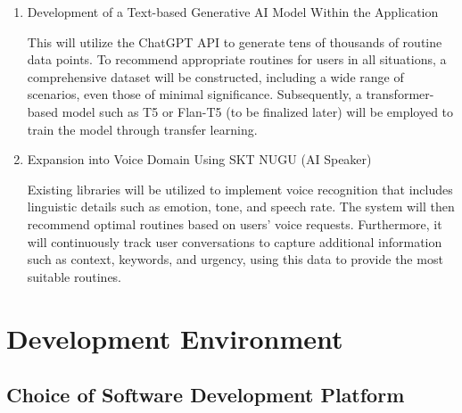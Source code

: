 \documentclass[conference]{IEEEtran}
\begin{document}
\begin{enumerate}[label=\arabic*]
    \item Development of a Text-based Generative AI Model Within the Application\par
    \vspace{0.3em}
    This will utilize the ChatGPT API to generate tens of thousands of routine data points. To recommend appropriate routines for users in all situations, a comprehensive dataset will be constructed, including a wide range of scenarios, even those of minimal significance. Subsequently, a transformer-based model such as T5 or Flan-T5 (to be finalized later) will be employed to train the model through transfer learning.

    \vspace{1em}

    \item Expansion into Voice Domain Using SKT NUGU (AI Speaker)\par
    \vspace{0.3em}
    Existing libraries will be utilized to implement voice recognition that includes linguistic details such as emotion, tone, and speech rate. The system will then recommend optimal routines based on users' voice requests. Furthermore, it will continuously track user conversations to capture additional information such as context, keywords, and urgency, using this data to provide the most suitable routines.
\end{enumerate}

\vspace{1em} %

\section{Development Environment}

\vspace{1em} %

\subsection{Choice of Software Development Platform}
\vspace{0.5em}
\end{document}
